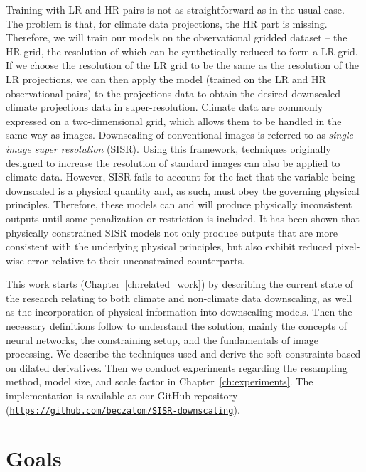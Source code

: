 Training with LR and HR pairs is not as straightforward as in the usual case.
The problem is that, for climate data projections, the HR part is missing.
Therefore, we will train our models on the observational gridded dataset -- the HR grid, the resolution of which can be synthetically reduced to form a LR grid.
If we choose the resolution of the LR grid to be the same as the resolution of the LR projections, we can then apply the model (trained on the LR and HR observational pairs) to the projections data to obtain the desired downscaled climate projections data in super-resolution.
\newpage
Climate data are commonly expressed on a two-dimensional grid, which allows them to be handled in the same way as images.
Downscaling of conventional images is referred to as \textit{single-image super resolution} (SISR).
Using this framework, techniques originally designed to increase the resolution of standard images can also be applied to climate data.
However, SISR fails to account for the fact that the variable being downscaled is a physical quantity and, as such, must obey the governing physical principles.
Therefore, these models can and will produce physically inconsistent outputs until some penalization or restriction is included. 
It has been shown that physically constrained SISR models not only produce outputs that are more consistent with the underlying physical principles, but also exhibit reduced pixel-wise error relative to their unconstrained counterparts.~\cite{Harder2023, Beucler2021}

This work starts  (Chapter~\ref{ch:related_work}) by describing the current state of the research relating to both climate and non-climate data downscaling, as well as the incorporation of physical information into downscaling models.
Then the necessary definitions follow to understand the solution, mainly the concepts of neural networks, the constraining setup, and the fundamentals of image processing.
We describe the techniques used and derive the soft constraints based on dilated derivatives.
Then we conduct experiments regarding the resampling method, model size, and scale factor in Chapter~\ref{ch:experiments}.
The implementation is available at our GitHub repository (\href{https://github.com/beczatom/SISR-downscaling}{\nolinkurl{https://github.com/beczatom/SISR-downscaling}}).

\section*{Goals}

